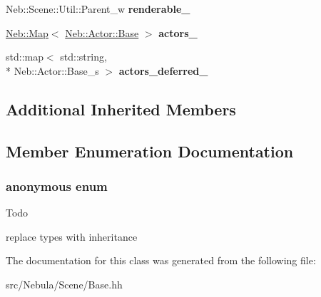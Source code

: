 \begin{DoxyCompactItemize}
\item 
\hypertarget{classNeb_1_1Scene_1_1Base_ab80c1fb37a3aa9bf1c3215b0f3614214}{Neb\-::\-Scene\-::\-Util\-::\-Parent\-\_\-w {\bfseries renderable\-\_\-}}\label{classNeb_1_1Scene_1_1Base_ab80c1fb37a3aa9bf1c3215b0f3614214}

\item 
\hypertarget{classNeb_1_1Scene_1_1Base_af8f8ecef2f02a6b5b30f444a17a260ef}{\hyperlink{classNeb_1_1Map}{Neb\-::\-Map}$<$ \hyperlink{classNeb_1_1Actor_1_1Base}{Neb\-::\-Actor\-::\-Base} $>$ {\bfseries actors\-\_\-}}\label{classNeb_1_1Scene_1_1Base_af8f8ecef2f02a6b5b30f444a17a260ef}

\item 
\hypertarget{classNeb_1_1Scene_1_1Base_abea83d53821e8fee2a51afc5223e9b7c}{std\-::map$<$ std\-::string, \\*
Neb\-::\-Actor\-::\-Base\-\_\-s $>$ {\bfseries actors\-\_\-deferred\-\_\-}}\label{classNeb_1_1Scene_1_1Base_abea83d53821e8fee2a51afc5223e9b7c}

\end{DoxyCompactItemize}
\subsection*{Additional Inherited Members}


\subsection{Member Enumeration Documentation}
\hypertarget{classNeb_1_1Scene_1_1Base_ad9c45dfefe66cecc599a4707b25a95f8}{\subsubsection[{anonymous enum}]{\setlength{\rightskip}{0pt plus 5cm}anonymous enum}}\label{classNeb_1_1Scene_1_1Base_ad9c45dfefe66cecc599a4707b25a95f8}
\begin{DoxyRefDesc}{Todo}
\item[{\bf Todo}]replace types with inheritance \end{DoxyRefDesc}


The documentation for this class was generated from the following file\-:\begin{DoxyCompactItemize}
\item 
src/\-Nebula/\-Scene/Base.\-hh\end{DoxyCompactItemize}
